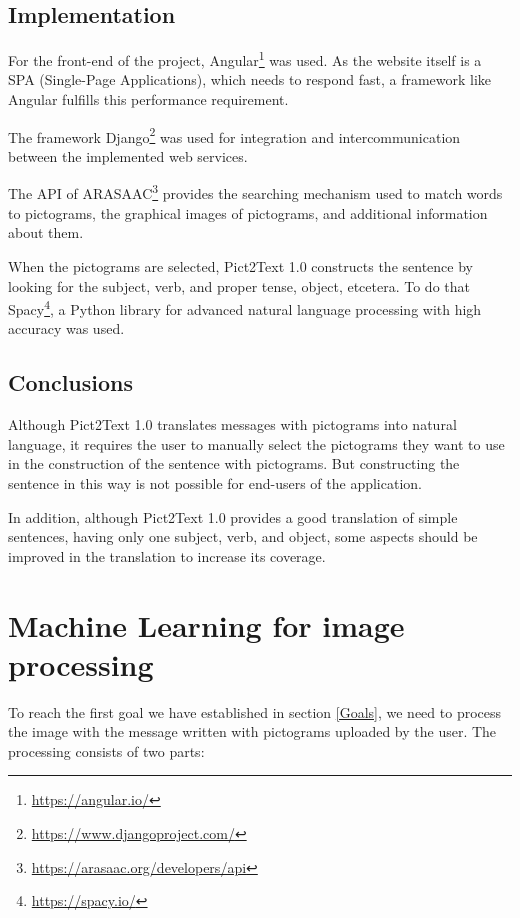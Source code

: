 \subsection{Implementation}

For the front-end of the project, Angular\footnote{\href{https://angular.io/}{https://angular.io/}} was used. As the website itself is a SPA (Single-Page Applications), which needs to respond fast, a framework like Angular fulfills this performance requirement.

The framework Django\footnote{\href{https://www.djangoproject.com/}{https://www.djangoproject.com/}} was used for integration and intercommunication between the implemented web services.

The API of ARASAAC\footnote{\href{https://arasaac.org/developers/api}{https://arasaac.org/developers/api}} provides the searching mechanism used to match words to pictograms, the graphical images of pictograms, and additional information about them.

When the pictograms are selected, Pict2Text 1.0 constructs the sentence by looking for the subject, verb, and proper tense, object, etcetera. To do that Spacy\footnote{\href{https://spacy.io/}{https://spacy.io/}}, a Python library for advanced natural language processing with high accuracy was used.

\subsection{Conclusions}

Although Pict2Text 1.0 translates messages with pictograms into natural language, it requires the user to manually select the pictograms they want to use in the construction of the sentence with pictograms. But constructing the sentence in this way is not possible for end-users of the application.

In addition, although Pict2Text 1.0 provides a good translation of simple sentences, having only one subject, verb, and object, some aspects should be improved in the translation to increase its coverage.

\section{Machine Learning for image processing}
\label{Image processing}

To reach the first goal we have established in section \ref{Goals}, we need to process the image with the message written with pictograms uploaded by the user. The processing consists of two parts:

